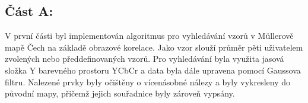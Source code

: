 \subsection*{Část A:}
V první části byl implementován algoritmus pro vyhledávání vzorů v Müllerově mapě Čech na základě obrazové korelace. Jako vzor slouží průměr pěti uživatelem zvolených nebo předdefinovaných vzorů. Pro vyhledávání byla využita jasová složka Y barevného prostoru YCbCr a data byla dále upravena pomocí Gaussova filtru. Nalezené prvky byly očištěny o vícenásobné nálezy a byly vykresleny do původní mapy, přičemž jejich souřadnice byly zároveň vypsány.